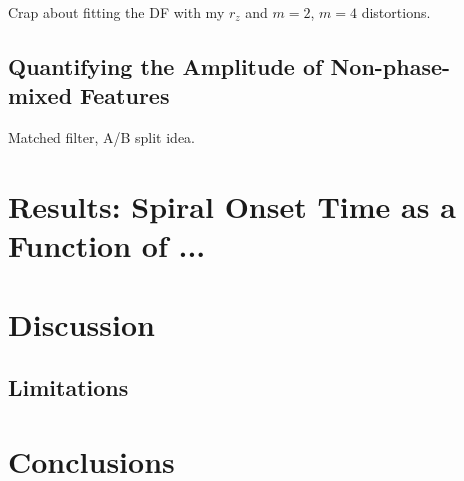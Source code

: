 Crap about fitting the DF with my $r_z$ and $m=2$, $m=4$ distortions.


\subsection{Quantifying the Amplitude of Non-phase-mixed Features}
\label{sec:residuals}

Matched filter, A/B split idea.


\section{Results: Spiral Onset Time as a Function of ...}
\label{sec:results}


\section{Discussion} \label{sec:discussion}

\subsection{Limitations}
\label{sec:limitations}


\section{Conclusions} \label{sec:conclusions}


